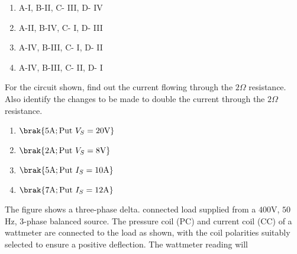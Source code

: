 \begin{figure}[!ht]
    \label{fig:my_label}
    \end{figure}

    \begin{multicols}{2}
    \begin{enumerate}
        \item A-I, B-II, C- III, D- IV
        \item A-II, B-IV, C- I, D- III
        \item A-IV, B-III, C- I, D- II
        \item A-IV, B-III, C- II, D- I
    \end{enumerate}
        
    \end{multicols}

    \item For the circuit shown, find out the current flowing through the $2\Omega$ resistance. Also identify the changes to be made to double the current through the $2\Omega$ resistance.
    \begin{figure}[!ht]
    \centering

    \label{fig:my_label}
    \end{figure}

    \begin{multicols}{2}
    \begin{enumerate}
        \item $\brak{5\text{A} ; \text{Put } V_S = 20\text{V}}$
        \item $\brak{2\text{A} ; \text{Put } V_S = 8\text{V}}$
        \item $\brak{5\text{A} ; \text{Put } I_S = 10\text{A}}$ 
        \item $\brak{7\text{A} ; \text{Put } I_S = 12\text{A}}$
    \end{enumerate}
    \end{multicols}

    \item The figure shows a three-phase delta. connected load supplied from a $400$V, $50$ Hz, $3$-phase balanced source. The pressure coil (PC) and current coil (CC) of a wattmeter are connected to the load as shown, with the coil polarities suitably selected to ensure a positive deflection. The wattmeter reading will

